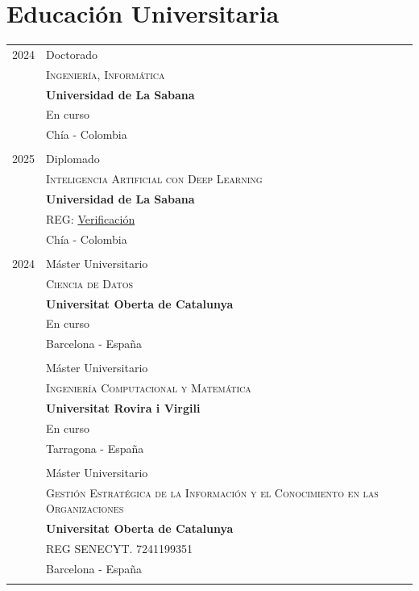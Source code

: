 \documentclass[a4paper]{article}
\begin{document}
\section{Educación Universitaria}
\begin{longtable}{r|p{12cm}}


\textsc{2024} & Doctorado \\ & \textsc{Ingeniería, Informática}\\
& \textbf{Universidad de La Sabana}\\
& En curso\\
&Chía - Colombia
\\\multicolumn{2}{c}{} \\
    
\textsc{2025} & Diplomado \\ & \textsc{Inteligencia Artificial con Deep Learning}\\
& \textbf{Universidad de La Sabana}\\
& REG: \href{https://unisabana.evolutool.com/index.php?chk=fdbd5ad273a37445359840c7b91a3087\&v=23449}{Verificación}\\
&Chía - Colombia
\\\multicolumn{2}{c}{} \\


\textsc{2024} & Máster Universitario \\ & \textsc{Ciencia de Datos}\\
& \textbf{Universitat Oberta de Catalunya}\\
& En curso\\
&Barcelona - España
\\\multicolumn{2}{c}{} \\

\textsc{2020} & Máster Universitario \\ & \textsc{Gestión Estratégica de la Información y el Conocimiento en las Organizaciones}\\
& \textbf{Universitat Oberta de Catalunya}\\
& REG SENECYT. 7241199351\\
&Barcelona - España
\\\multicolumn{2}{c}{} \\


\end{longtable}
\end{document}
